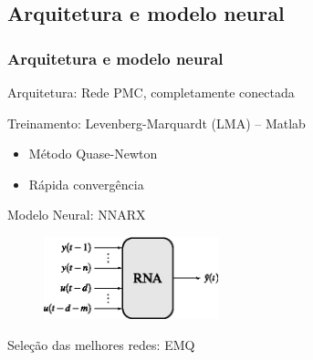 \documentclass{beamer}
\begin{document}
\subsection{Arquitetura e modelo neural}
\begin{frame}
    \frametitle{Arquitetura e modelo neural}

    Arquitetura: Rede PMC, completamente conectada

    \vspace{0.25cm}

    Treinamento: Levenberg-Marquardt (LMA) -- Matlab\reg

\begin{itemize}
    \item Método Quase-Newton
    \item Rápida convergência
\end{itemize}

    Modelo Neural: NNARX
    
\begin{figure}[htb]
\centering
    \includegraphics[width=0.45\textwidth]{imgs/rnas/eps/nnarx}
\end{figure}

    \vspace{0.25cm}

    Seleção das melhores redes: EMQ

\end{frame}

\end{document}
